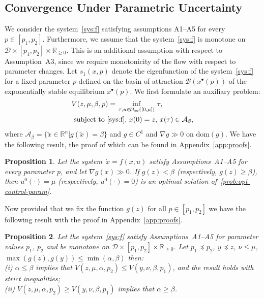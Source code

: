 \documentclass[letterpaper, 10pt, journal]{IEEEtran}  %
\newcommand{\R}{{\mathbb R}}
\newcommand{\Rnn}{{\mathbb R}_{\ge 0}}
\newcommand{\cA}{{\mathcal A}}
\newcommand{\cB}{{\mathcal B}}
\newcommand{\cD}{{\mathcal D}}
\newcommand{\cU}{{\mathcal U}}
\newcommand{\dom}{\mathrm{dom}}
\newtheorem{prop}{Proposition}
\begin{document}
\subsection{Convergence Under Parametric Uncertainty}\label{ss:param-unc}

We consider the system~\eqref{sys:f} satisfying assumptions {A1--A5} for every $p\in[p_1,p_2]$. Furthermore, we assume that the system~\eqref{sys:f} is monotone on $\cD\times [p_1, p_2]\times \Rnn$. This is an additional assumption with respect to Assumption~A3, since we require monotonicity of the flow with respect to parameter changes. Let $s_1(x,p)$ denote the eigenfunction of the system~\eqref{sys:f} for a fixed parameter $p$ defined on the basin of attraction $\cB(x^\bullet(p))$ of the exponentially stable equilibrium $x^\bullet(p)$. We first formulate  an auxiliary problem:
\begin{align}
&V(z, \mu, \beta, p) = \inf\limits_{\begin{smallmatrix}\tau, u \in \cU_\infty([0,\mu]) \end{smallmatrix}} \tau, \label{prob:opt-control-param} \\
\notag &\text{ subject to~\eqref{sys:f}},\, x(0) = z,\, x(\tau) \in \cA_\beta,
\end{align}
where $\cA_\beta = \{\tilde x\in \R^n | g(\tilde x) = \beta\}$ and $g\in C^1$ and $\nabla g\gg 0$ on $\dom(g)$. We have the following result, the proof of which can be found in Appendix~\ref{app:proofs}.
\begin{prop}\label{prop:mon-val-fun-gen}
	Let the system~$\dot x =f(x, u)$ satisfy Assumptions~A1--A5 for every parameter $p$, and let  $\nabla g(x) \gg 0$. If $g(z) < \beta$ (respectively, $g(z) \ge \beta$), then $u^0(\cdot) = \mu$ (respectively, $u^0(\cdot) = 0$) is an optimal solution of~\eqref{prob:opt-control-param}. 
\end{prop}
Now provided that we fix the function $g(z)$ for all $p\in[p_1, p_2]$ we have the following result with the proof in Appendix~\ref{app:proofs}.

\begin{prop} \label{prop:opt-control-param}
	Let the system~\eqref{sys:f} satisfy Assumptions~{A1--A5} for parameter values $p_1$, $p_2$ and be monotone on $\cD\times [p_1, p_2]\times \Rnn$. Let $p_1 \preceq p_2$, $y \preceq z$, $\nu \le \mu$, $\max(g(z), g(y)) \le \min(\alpha,\beta)$ then:\\
	(i) $\alpha \le \beta$ implies that $V(z, \mu, \alpha, p_2) \le V(y, \nu, \beta, p_1)$, and the result holds with strict inequalities;\\
	(ii) $V(z, \mu, \alpha, p_2) \ge V(y, \nu, \beta, p_1)$ implies that $\alpha \ge \beta$.
\end{prop}
\end{document}
